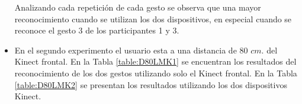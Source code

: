 \begin{itemize}
Analizando cada repetición de cada gesto se observa que una mayor reconocimiento cuando se utilizan los dos dispositivos, en especial cuando se reconoce el gesto 3 de los participantes 1 y 3. 


\item En el segundo experimento el usuario esta a una distancia de $80$ $cm.$ del Kinect frontal. En la Tabla \ref{table:D80LMK1} se encuentran los resultados del reconocimiento de los dos gestos utilizando solo el Kinect frontal. En la Tabla \ref{table:D80LMK2} se presentan los resultados utilizando los dos dispositivos Kinect.    

%


\end{itemize}
